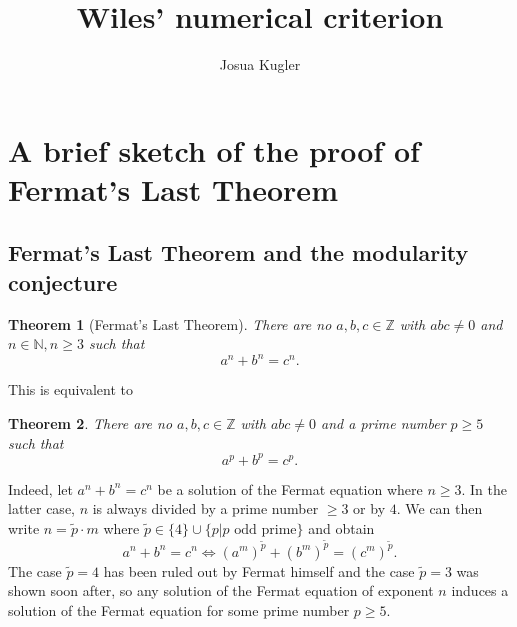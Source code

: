 \documentclass{article}
\title{Wiles' numerical criterion}
\author{Josua Kugler}
\theoremstyle{plain}%
\newtheorem{theorem}{Theorem}[section]
\theoremstyle{definition}
\theoremstyle{remark}
\begin{document}
\maketitle
\tableofcontents
\newpage

\section{A brief sketch of the proof of Fermat's Last Theorem}
\subsection{Fermat's Last Theorem and the modularity conjecture}
\begin{theorem}[Fermat's Last Theorem]
    There are no \(a, b, c \in \mathbb{Z}\) with \(abc \neq 0\) and \(n \in \mathbb{N}, n \geq 3\) such that
    \[
        a^n + b^n = c^n.  
    \]
\end{theorem}
This is equivalent to
\begin{theorem}
    There are no \(a, b, c \in \mathbb{Z}\) with \(abc \neq 0\) and a prime number \(p \geq 5\) such that
    \[
        a^p + b^p = c^p.  
    \]
\end{theorem}
Indeed, let \(a^n + b^n = c^n\) be a solution of the Fermat equation where \(n \geq 3\).
In the latter case, \(n\) is always divided by a prime number \(\geq 3\) or by \(4\).
We can then write \(n = \tilde{p} \cdot m\) where \(\tilde p \in \{4\} \cup \{p | p \text{ odd prime}\}\)
and obtain 
\[
    a^n + b^n = c^n \Leftrightarrow (a^m)^{\tilde p} + (b^m)^{\tilde p} = (c^m)^{\tilde p}.  
\]
The case \(\tilde p = 4\) has been ruled out by Fermat himself and the case \(\tilde p = 3\)
was shown soon after, so any solution of the Fermat equation of exponent \(n\) 
induces a solution of the Fermat equation for some prime number \(p\geq 5\).
\end{document}
